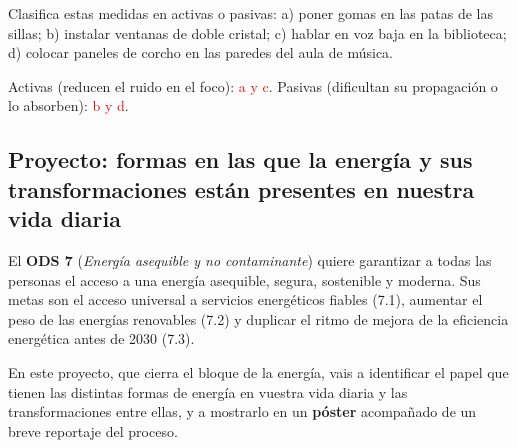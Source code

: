 \begin{exercise}
    Clasifica estas medidas en activas o pasivas: a) poner gomas en las patas de las sillas; b) instalar ventanas de doble cristal; c) hablar en voz baja en la biblioteca; d) colocar paneles de corcho en las paredes del aula de música.
    \begin{solu}
        Activas (reducen el ruido en el foco): \textcolor{red}{a y c}. Pasivas (dificultan su propagación o lo absorben): \textcolor{red}{b y d}.
    \end{solu}
\end{exercise}

\subsection[Proyecto: la energía en nuestra vida diaria]{Proyecto: formas en las que la energía y sus transformaciones están presentes en nuestra vida diaria}

El \textbf{ODS 7} (\emph{Energía asequible y no contaminante}) quiere garantizar a todas las personas el acceso a una energía asequible, segura, sostenible y moderna. Sus metas son el acceso universal a servicios energéticos fiables (7.1), aumentar el peso de las energías renovables (7.2) y duplicar el ritmo de mejora de la eficiencia energética antes de 2030 (7.3).

En este proyecto, que cierra el bloque de la energía, vais a identificar el papel que tienen las distintas formas de energía en vuestra vida diaria y las transformaciones entre ellas, y a mostrarlo en un \textbf{póster} acompañado de un breve reportaje del proceso.

